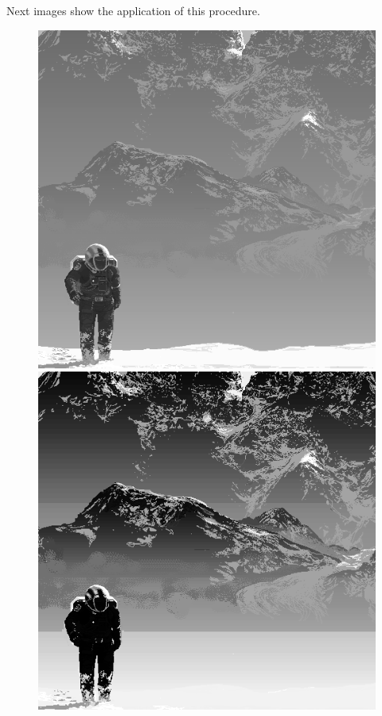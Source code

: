 \documentclass[oneside,a4paper,english,links,12pt]{article}
\begin{document}
Next images show the application of this procedure.
\begin{figure}[htb]
\centering
\includegraphics[scale=0.25]{imagenes/edge}
\includegraphics[scale=0.25]{imagenes/edgeeq}

\end{figure}
\end{document}
